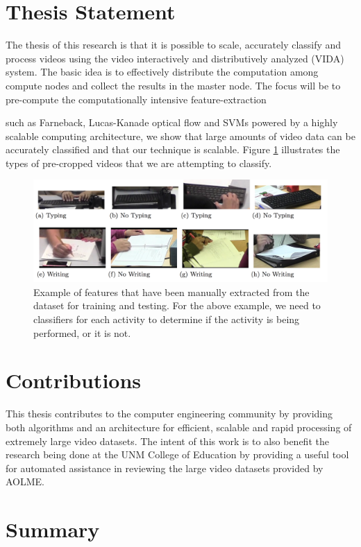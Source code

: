 \section{\label{section:thesis_statement}Thesis Statement}
The thesis of this research is that it is possible to scale, accurately
  classify and process videos using
  the video interactively and distributively analyzed (VIDA) system.
The basic idea is to effectively distribute the computation among
  compute nodes and collect the results in the master node.
The focus will be to pre-compute the computationally intensive
  feature-extraction
   
  
such as Farneback, Lucas-Kanade optical flow and SVMs powered by a highly scalable
computing architecture, we show that large amounts of video data can be
accurately classified and that our technique is scalable. Figure \ref{fig:typing_writing}
illustrates the types of pre-cropped videos that we are attempting to classify.

\begin{figure}[h]
  \label{fig:typing_writing}
  \centering
  \includegraphics[width=\textwidth]{figures/typing_writing_clip}
  \caption{Example of features that have been manually extracted from the dataset
  for training and testing. For the above example, we need to classifiers for each
  activity to determine if the activity is being performed, or it is not.}
\end{figure}

\section{\label{section:contributions}Contributions}
This thesis contributes to the computer engineering community by providing both
algorithms and an architecture for efficient, scalable and rapid processing of
extremely large video datasets. The intent of this work is to also benefit
the research being done at the UNM College of Education by providing a useful
tool for automated assistance in reviewing the large video datasets provided
by AOLME.

\section{\label{section:summary}Summary}
